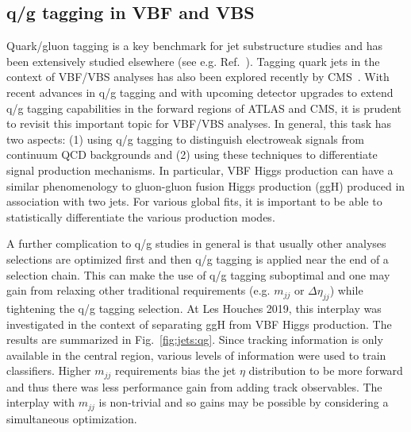\documentclass[11pt]{cernrep}
\begin{document}


\clearpage

\subsection{q/g tagging in VBF and VBS}
\label{sec:jets:vbsbvf}

Quark/gluon tagging is a key benchmark for jet substructure studies and has been extensively studied elsewhere (see e.g. Ref.~\cite{Badger:2016bpw,Gras:2017jty}).  Tagging quark jets in the context of VBF/VBS analyses has also been explored recently by CMS~\cite{Khachatryan:2015bnx}.  With recent advances in q/g tagging and with upcoming detector upgrades to extend q/g tagging capabilities in the forward regions of ATLAS and CMS, it is prudent to revisit this important topic for VBF/VBS analyses.  In general, this task has two aspects: (1) using q/g tagging to distinguish electroweak signals from continuum QCD backgrounds and (2) using these techniques to differentiate signal production mechanisms.  In particular, VBF Higgs production can have a similar phenomenology to gluon-gluon fusion Higgs production (ggH) produced in association with two jets.  For various global fits, it is important to be able to statistically differentiate the various production modes.

A further complication to q/g studies in general is that usually other analyses selections are optimized first and then q/g tagging is applied near the end of a selection chain.  This can make the use of q/g tagging suboptimal and one may gain from relaxing other traditional requirements (e.g. $m_{jj}$ or $\Delta\eta_{jj}$) while tightening the q/g tagging selection.  At Les Houches 2019, this interplay was investigated in the context of separating ggH from VBF Higgs production.  The results are summarized in Fig.~\ref{fig:jets:qg}.  Since tracking information is only available in the central region, various levels of information were used to train classifiers.  Higher $m_{jj}$ requirements bias the jet $\eta$ distribution to be more forward and thus there was less performance gain from adding track observables.  The interplay with $m_{jj}$ is non-trivial and so gains may be possible by considering a simultaneous optimization. 
\end{document}

